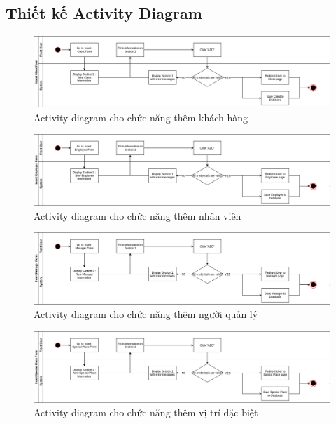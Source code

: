 \documentclass[a4paper]{article}
\begin{document}
\subsection{Thiết kế Activity Diagram}
\begin{figure}[!h]
    \includegraphics[width=14.7cm]{ActivityDiagram/AddCustomer}
    \centering
    \caption{Activity diagram cho chức năng thêm khách hàng}
    \label{fig:activity_add_customer}
\end{figure}
\begin{figure}[!h]
    \includegraphics[width=14.7cm]{ActivityDiagram/AddEmployee}
    \centering
    \caption{Activity diagram cho chức năng thêm nhân viên}
    \label{fig:activity_add_employee}
\end{figure}
\begin{figure}[!h]
    \includegraphics[width=14.7cm]{ActivityDiagram/AddManager}
    \centering
    \caption{Activity diagram cho chức năng thêm người quản lý}
    \label{fig:activity_add_manager}
\end{figure}
\clearpage
\begin{figure}[!h]
    \includegraphics[width=14.7cm]{ActivityDiagram/AddSpecialPlace}
    \centering
    \caption{Activity diagram cho chức năng thêm vị trí đặc biệt}
    \label{fig:activity_add_special_place}
\end{figure}
\end{document}
